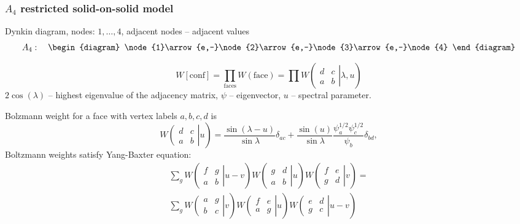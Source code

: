 \documentclass[pdftex]{beamer}
\theoremstyle{definition} \newtheorem{Def}{Definition}
\begin{document}
\begin{frame}
  \frametitle{$A_4$  restricted solid-on-solid model}
  Dynkin diagram, nodes: $1,\dots,4$, adjacent nodes -- adjacent values
  \begin{equation}
    \label{eq:4}
    A_4:\quad
    \begin{diagram}
      \node{1}\arrow{e,-}\node{2}\arrow{e,-}\node{3}\arrow{e,-}\node{4}
    \end{diagram}
  \end{equation}

  \begin{equation}
    \label{eq:3}
    W[\mathrm{conf}]=\prod_{\mathrm{faces}} W(\mathrm{face}) =\prod W\left(\left.\begin{array}{cc}d & c\\a &b\end{array} \right| \lambda, u\right)
  \end{equation}
  $2\cos(\lambda)$ -- highest eigenvalue of the adjacency matrix, $\psi$ -- eigenvector, $u$ -- spectral parameter.

Bolzmann weight for a face with vertex labels $a,b,c,d$ is 
\begin{equation}
    W\left.\left(
    \begin{array}{cc}
      d & c\\
      a & b
    \end{array}\right| u \right)
= \frac{\sin(\lambda-u)}{\sin\lambda}\delta_{ac} + \frac{\sin(u)}{\sin\lambda}\frac{ \psi_a^{1/2}
  \psi_c^{1/2}}{\psi_b} \delta_{bd},
\end{equation}
Boltzmann weights satisfy Yang-Baxter equation:
\begin{multline}
  \label{eq:15}
  \sum_{g} W\left.\left(
    \begin{array}{cc}
      f & g\\
      a & b
    \end{array}\right| u-v \right) W\left.\left(
    \begin{array}{cc}
      g & d\\
      a & b
    \end{array}\right| u \right) W\left.\left(
    \begin{array}{cc}
      f & e\\
      g & d
    \end{array}\right| v \right)=\\
  \sum_{g} W\left.\left(
    \begin{array}{cc}
      a & g\\
      b & c
    \end{array}\right| v \right) W\left.\left(
    \begin{array}{cc}
      f & e\\
      a & g
    \end{array}\right| u \right) W\left.\left(
    \begin{array}{cc}
      e & d\\
      g & c
    \end{array}\right| u-v \right)
\end{multline}
\end{frame}
\end{document}
